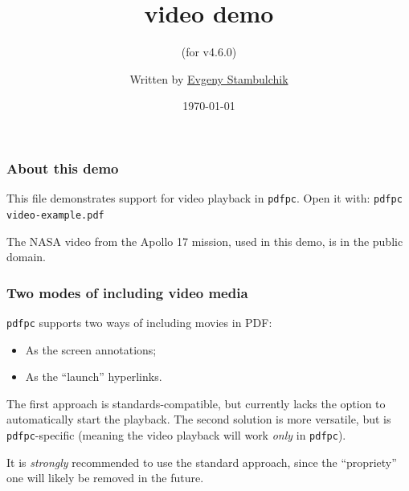 \documentclass{beamer}
\title{\pdfpc video demo}
\subtitle{(for v4.6.0)}
\author[E. Stambulchik]{Written by
                  \href{https://github.com/fnevgeny}{Evgeny Stambulchik}}
\date{\today}
\institute{}
\newcommand{\pdfpc}{\texttt{pdfpc}\xspace}
\newcommand{\opt}[1]{\texttt{#1}\xspace}
\begin{document}
\begin{frame}
  \titlepage
  \hypertarget{titlePage}{}
\end{frame}

\begin{frame}
  \frametitle{About this demo}

  This file demonstrates support for video playback in \pdfpc.
  Open it with: \opt{pdfpc video-example.pdf}
  
  \vfill
  
  {\small The NASA video from the Apollo 17 mission, used in this demo, is
  in the public domain.}
  
\end{frame}

\begin{frame}
  \frametitle{Two modes of including video media}

  \pdfpc supports two ways of including movies in PDF:

  \begin{itemize}
    \item As the screen annotations;
    \item As the ``launch'' hyperlinks.
  \end{itemize}

  \begin{block}{}
    The first approach is standards-compatible, but currently lacks the option
    to automatically start the playback. The second solution is more versatile,
    but is \pdfpc-specific (meaning the video playback will work {\em only} in
    \pdfpc).
  \end{block}

  \begin{alertblock}{}
    It is {\em strongly} recommended to use the standard approach, since the
    ``propriety'' one will likely be removed in the future.
  \end{alertblock}
\end{frame}
\end{document}
